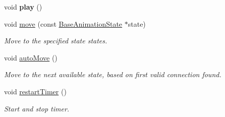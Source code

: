 \begin{Indent}
\begin{DoxyCompactItemize}
\mbox{\label{classrev_1_1_motion_a7ccafdbc20144deb6a48028c35fe32cc}} 
void {\bfseries play} ()
\item 
\mbox{\label{classrev_1_1_motion_a6a1f77ee268b6c23b7e95bf846b8fa60}} 
void \mbox{\hyperlink{classrev_1_1_motion_a6a1f77ee268b6c23b7e95bf846b8fa60}{move}} (const \mbox{\hyperlink{classrev_1_1_base_animation_state}{Base\+Animation\+State}} $\ast$state)
\begin{DoxyCompactList}\small\item\em Move to the specified state states. \end{DoxyCompactList}\item 
\mbox{\label{classrev_1_1_motion_af75d90915331e71d3ac6bc6a2cdfe9d6}} 
void \mbox{\hyperlink{classrev_1_1_motion_af75d90915331e71d3ac6bc6a2cdfe9d6}{auto\+Move}} ()
\begin{DoxyCompactList}\small\item\em Move to the next available state, based on first valid connection found. \end{DoxyCompactList}\item 
\mbox{\label{classrev_1_1_motion_aede527fde69ccf762d8ff69eb884e490}} 
void \mbox{\hyperlink{classrev_1_1_motion_aede527fde69ccf762d8ff69eb884e490}{restart\+Timer}} ()
\begin{DoxyCompactList}\small\item\em Start and stop timer. \end{DoxyCompactList}\end{DoxyCompactItemize}
\end{Indent}
